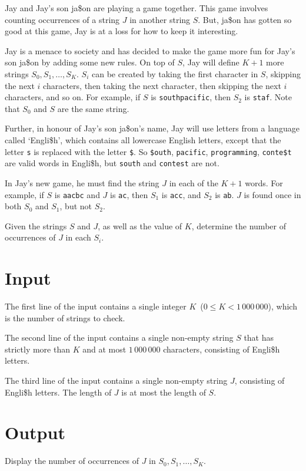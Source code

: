 
Jay and Jay's son ja\$on are playing a game together. This game involves counting
occurrences of a string $J$ in another string $S$. But, ja\$on has
gotten so good at this game, Jay is at a loss for how to keep it interesting.

Jay is a menace to society and has decided to make the game more fun for Jay's
son ja\$on by adding some new rules. On top of $S$, Jay will define $K + 1$ more strings
$S_0, S_1, \dots, S_K$. $S_i$ can be created by taking the first character in $S$, skipping the next $i$ characters, then taking the next character, then skipping the next $i$ characters, and so on. For example, if $S$ is \texttt{southpacific}, then $S_2$ is \texttt{staf}. Note that $S_0$ and $S$ are the same string.

Further, in honour of Jay's son ja\$on's name, Jay will use letters from a language called `Engli\$h', which contains all lowercase English letters, except that the letter \texttt{s} is replaced with the letter \texttt{\$}. So \texttt{\$outh}, \texttt{pacific}, \texttt{programming}, \texttt{conte\$t} are valid words in Engli\$h, but \texttt{south} and \texttt{contest} are not.

In Jay's new game, he must find the string $J$ in each of the $K+1$ words.
For example, if $S$ is \texttt{aacbc} and $J$ is \texttt{ac}, then $S_1$ is \texttt{acc}, and $S_2$ is \texttt{ab}. $J$ is found once in both $S_0$ and $S_1$, but not $S_2$.

Given the strings $S$ and $J$, as well as the value of $K$, determine the number of occurrences of $J$ in each $S_i$.


\section*{Input}

The first line of the input contains a single integer $K$~($0 \leq K < 1\,000\,000$),
which is the number of strings to check.

The second line of the input contains a single non-empty string $S$ that has strictly more than $K$ and at most $1\,000\,000$ characters, consisting of Engli\$h letters.

The third line of the input contains a single non-empty string $J$, consisting of Engli\$h letters. The length of $J$ is at most the length of $S$.


\section*{Output}

Display the number of occurrences of $J$ in $S_0, S_1, \dots, S_K$.

